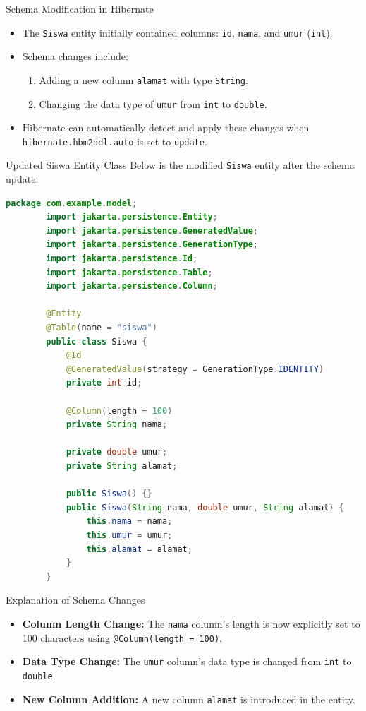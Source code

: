 \documentclass[aspectratio=169, table]{beamer}
\begin{document}
\begin{frame}{Schema Modification in Hibernate}
	\vspace{20pt}
	\begin{itemize}
		\item The \texttt{Siswa} entity initially contained columns: \texttt{id}, \texttt{nama}, and \texttt{umur} (\texttt{int}).
		\item Schema changes include:
		\begin{enumerate}
			\item Adding a new column \texttt{alamat} with type \texttt{String}.
			\item Changing the data type of \texttt{umur} from \texttt{int} to \texttt{double}.
		\end{enumerate}
		\item Hibernate can automatically detect and apply these changes when \texttt{hibernate.hbm2ddl.auto} is set to \texttt{update}.
	\end{itemize}
\end{frame}

\begin{frame}[fragile]{Updated Siswa Entity Class}
	\vspace{20pt}
	Below is the modified \texttt{Siswa} entity after the schema update:
	
	\begin{lstlisting}[language=Java, style=JavaStyle]
		package com.example.model;
		import jakarta.persistence.Entity;
		import jakarta.persistence.GeneratedValue;
		import jakarta.persistence.GenerationType;
		import jakarta.persistence.Id;
		import jakarta.persistence.Table;
		import jakarta.persistence.Column;
		
		@Entity
		@Table(name = "siswa")
		public class Siswa {
			@Id
			@GeneratedValue(strategy = GenerationType.IDENTITY)
			private int id;
			
			@Column(length = 100)
			private String nama;
			
			private double umur;
			private String alamat;
			
			public Siswa() {}
			public Siswa(String nama, double umur, String alamat) {
				this.nama = nama;
				this.umur = umur;
				this.alamat = alamat;
			}
		}
	\end{lstlisting}
\end{frame}

\begin{frame}{Explanation of Schema Changes}
	\vspace{20pt}
	\begin{itemize}
		\item \textbf{Column Length Change:} The \texttt{nama} column's length is now explicitly set to 100 characters using \texttt{@Column(length = 100)}.
		\item \textbf{Data Type Change:} The \texttt{umur} column's data type is changed from \texttt{int} to \texttt{double}.
		\item \textbf{New Column Addition:} A new column \texttt{alamat} is introduced in the entity.
	\end{itemize}
\end{frame}
\end{document}
